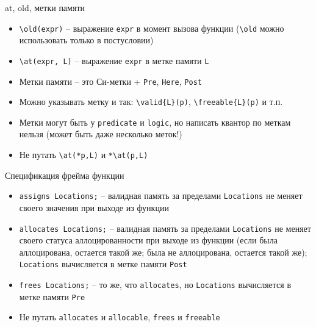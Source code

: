 \documentclass[hyperref={unicode=true}]{beamer}
\begin{document}
    \begin{frame}[fragile]{at, old, метки памяти}
    \begin{itemize}
    \item
    \verb|\old(expr)| -- выражение \verb|expr| в момент вызова функции
    (\verb|\old| можно использовать только в постусловии)
    \item
    \verb|\at(expr, L)| -- выражение \verb|expr| в метке памяти \verb|L|
    \item
    Метки памяти -- это Си-метки + \verb|Pre|, \verb|Here|, \verb|Post|
    \item
    Можно указывать метку и так: \verb|\valid{L}(p)|, \verb|\freeable{L}(p)| и т.п.
    \item
    Метки могут быть у \verb|predicate| и \verb|logic|, но написать квантор по меткам нельзя
    (может быть даже несколько меток!)
    \item
    Не путать \verb|\at(*p,L)| и \verb|*\at(p,L)|
    \end{itemize}
    \end{frame}

    \begin{frame}[fragile]{Спецификация фрейма функции}
    \begin{itemize}
    \item
    \verb|assigns Locations;| -- валидная память за пределами \verb|Locations|
    не меняет своего значения при выходе из функции
    \item
    \verb|allocates Locations;| -- валидная память за пределами \verb|Locations|
    не меняет своего статуса аллоцированности при выходе из функции
    (если была аллоцирована, остается такой же; была не аллоцирована,
     остается такой же); \verb|Locations| вычисляется в метке памяти \verb|Post|
    \item
    \verb|frees Locations;| -- то же, что \verb|allocates|, но \verb|Locations|
    вычисляется в метке памяти \verb|Pre|
    \item
    Не путать \verb|allocates| и \verb|allocable|, \verb|frees| и \verb|freeable|
    \end{itemize}
    \end{frame}

\end{document}
